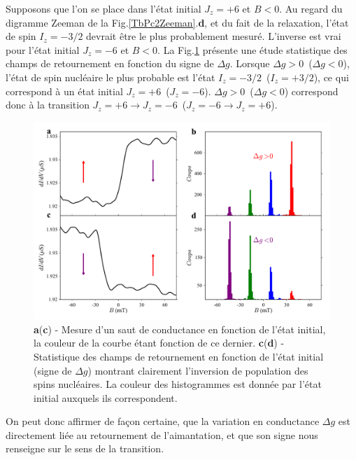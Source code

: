 Supposons que l'on se place dans l'état initial $J_z=+6$ et $B<0$. Au regard du digramme Zeeman de la Fig.\ref{TbPc2Zeeman}.\textbf{d}, et du fait de la relaxation, l'état de spin $I_z = -3/2$ devrait être le plus probablement mesuré. L'inverse est vrai pour l'état initial $J_z=-6$ et $B<0$. La Fig.\ref{analyse_signe_saut} présente une étude statistique des champs de retournement en fonction du signe de $\Delta g$. Lorsque $\Delta g> 0$~($\Delta g< 0$), l'état de spin nucléaire le plus probable est l'état $I_z = -3/2$~($I_z = +3/2$), ce qui correspond à un état initial $J_z=+6$~($J_z=-6$). $\Delta g> 0$~($\Delta g< 0$) correspond donc à la transition $J_z = +6 \rightarrow J_z =  - 6$~($J_z = -6 \rightarrow J_z =  + 6$).

\begin{figure}
\includegraphics[scale=0.45]{Resultats/JumpSens/JumpSens.pdf} 
\caption{\textbf{a}(\textbf{c}) - Mesure d'un saut de conductance en fonction de l'état initial, la couleur de la courbe étant fonction de ce dernier. \textbf{c}(\textbf{d}) - Statistique des champs de retournement en fonction de l'état initial (signe de $\Delta g$) montrant clairement l'inversion de population des spins nucléaires. La couleur des histogrammes est donnée par l'état initial auxquels ils correspondent.}
\label{analyse_signe_saut}
\end{figure}

On peut donc affirmer de façon certaine, que la variation en conductance $\Delta g$ est directement liée au retournement de l'aimantation, et que son signe nous renseigne sur le sens de la transition.


